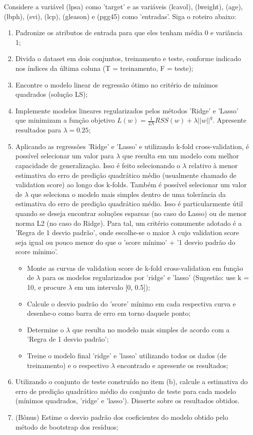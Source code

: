 Considere a variável (lpsa) como 'target' e as variáveis (lcavol), (lweight), (age), (lbph), (svi), (lcp), (gleason) e (pgg45) como 'entradas'. Siga o roteiro abaixo:
\begin{enumerate}[label=(\alph*)]
    \item Padronize os atributos de entrada para que eles tenham média 0 e variância 1;
    \item Divida o dataset em dois conjuntos, treinamento e teste, conforme indicado nos índices da última coluna (T = treinamento, F = teste);
    \item Encontre o modelo linear de regressão ótimo no critério de mínimos quadrados (solução LS);
    \item Implemente modelos lineares regularizados pelos métodos 'Ridge' e 'Lasso' que minimizam a função objetivo \( L(w) = \frac{1}{2N} RSS(w) + \lambda ||w||^q \). Apresente resultados para \( \lambda = 0.25 \);
    \item Aplicando as regressões 'Ridge' e 'Lasso' e utilizando k-fold cross-validation, é possível selecionar um valor para \( \lambda \) que resulta em um modelo com melhor capacidade de generalização. Isso é feito selecionando o \( \lambda \) relativo à menor estimativa do erro de predição quadrático médio (usualmente chamado de validation score) ao longo dos k-folds. Também é possível selecionar um valor de \( \lambda \) que seleciona o modelo mais simples dentro de uma tolerância da estimativa do erro de predição quadrático médio. Isso é particularmente útil quando se deseja encontrar soluções esparsas (no caso do Lasso) ou de menor norma L2 (no caso do Ridge). Para tal, um critério comumente adotado é a 'Regra de 1 desvio padrão', onde escolhe-se o maior \( \lambda \) cujo validation score seja igual ou pouco menor do que o 'score mínimo' + '1 desvio padrão do score mínimo'.
    \begin{itemize}[label=-]
        \item Monte as curvas de validation score de k-fold cross-validation em função de \( \lambda \) para os modelos regularizados por 'ridge' e 'lasso' (Sugestão: use k = 10, e procure \( \lambda \) em um intervalo [0, 0.5]);
        \item Calcule o desvio padrão do 'score' mínimo em cada respectiva curva e desenhe-o como barra de erro em torno daquele ponto;
        \item Determine o \( \lambda \) que resulta no modelo mais simples de acordo com a 'Regra de 1 desvio padrão';
        \item Treine o modelo final 'ridge' e 'lasso' utilizando todos os dados (de treinamento) e o respectivo \( \lambda \) encontrado e apresente os resultados;
    \end{itemize}
    \item Utilizando o conjunto de teste construído no item (b), calcule a estimativa do erro de predição quadrático médio do conjunto de teste para cada modelo (mínimos quadrados, 'ridge' e 'lasso'). Disserte sobre os resultados obtidos.
    \item (Bônus) Estime o desvio padrão dos coeficientes do modelo obtido pelo método de bootstrap dos resíduos;
\end{enumerate}

